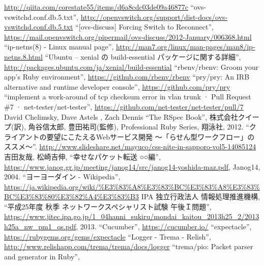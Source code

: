 \begin{thebibliography}{99}
         \url{http://qiita.com/corestate55/items/d6a8cdc03de09a46877c}
         ``ovs-vswitchd.conf.db.5.txt'',
         \url{http://openvswitch.org/support/dist-docs/ovs-vswitchd.conf.db.5.txt}
         ``[ovs-discuss] Forcing Switch to Reconnect'',
         \url{https://mail.openvswitch.org/pipermail/ovs-discuss/2012-January/006368.html}
         ``ip-netns(8) - Linux manual page'',
         \url{http://man7.org/linux/man-pages/man8/ip-netns.8.html}
         ``Ubuntu – xenial の build-essential パッケージに関する詳細'',
         \url{http://packages.ubuntu.com/ja/xenial/build-essential}
         ``rbenv/rbenv: Groom your app’s Ruby environment'',
         \url{https://github.com/rbenv/rbenv}
         ``pry/pry: An IRB alternative and runtime developer console'',
         \url{https://github.com/pry/pry}
  ``implement a work-around of tcp checksum
         error in vlan trunk · Pull Request \#7 ·
         net-tester/net-tester'',
         \url{https://github.com/net-tester/net-tester/pull/7}
  David Chelimsky, Dave Astels , Zach Dennis ``The
         RSpec Book'', 株式会社クイープ(訳), 角谷信太郎, 豊田祐司(監修),
         Professional Ruby Series, 翔泳社, 2012.
         ``クライアントの要望にこたえるWebサービス開発 ～「らせん型ワークフロー」のススメ～''.
         \url{http://www.slideshare.net/mayuco/css-nite-in-sapporo-vol5-14085124}
         吉田友哉, 松崎吉伸,
         ``幸せなパケット転送 ○○編'',
         \url{https://www.janog.gr.jp/meeting/janog14/src/janog14-yoshida-maz.pdf},
         Janog14, 2004.
         ``ヨーヨーダイン - Wikipedia'',
         \url{https://ja.wikipedia.org/wiki/\%E3\%83\%A8\%E3\%83\%BC\%E3\%83\%A8\%E3\%83\%BC\%E3\%83\%80\%E3\%82\%A4\%E3\%83\%B3}
         IPA 独立行政法人 情報処理推進機構,
         ``平成25年度 秋季 ネットワークスペシャリスト試験 午後Ｉ問題'',
         \url{https://www.jitec.ipa.go.jp/1_04hanni_sukiru/mondai_kaitou_2013h25_2/2013h25a_nw_pm1_qs.pdf}, 2013.
         ``Cucumber'',
         \url{https://cucumber.io/}
         ``expectacle'',
         \url{https://rubygems.org/gems/expectacle}
         ``Logger - Trema - Relish'',
         \url{http://www.relishapp.com/trema/trema/docs/logger}
         ``trema/pio: Packet parser and generator in Ruby'',

\end{thebibliography}
